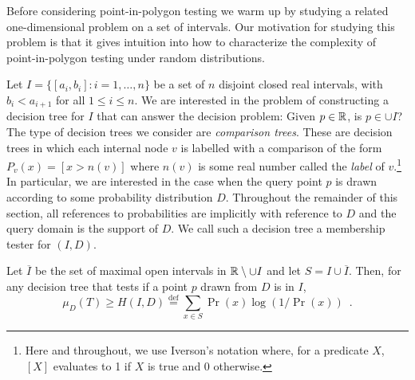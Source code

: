 \documentclass[charterfonts,lotsofwhite]{patmorin}
\newcommand{\defequals}{\stackrel{\mathrm{def}}{=}}
\begin{document}
Before considering point-in-polygon testing we warm up by studying a
related one-dimensional problem on a set of intervals.  Our motivation
for studying this problem is that it gives intuition into how to
characterize the complexity of point-in-polygon testing under random
distributions.

Let $I=\{[a_i,b_i]: i=1,\ldots,n\}$ be a set of $n$ disjoint closed
real intervals, with $b_i < a_{i+1}$ for all $1\le i\le n$.  We are
interested in the problem of constructing a decision tree for $I$ that
can answer the decision problem: Given $p\in\mathbb{R}$, is $p\in \cup I$?
The type of decision trees we consider are \emph{comparison trees}.
These are decision trees in which each internal node $v$ is labelled
with a comparison of the form $P_v(x) = [x > n(v)]$ where $n(v)$ is
some real number called the \emph{label} of $v$.\footnote{Here and
throughout, we use Iverson's notation \cite{kXX} where, for a
predicate $X$, $[X]$ evaluates to 1 if $X$ is true and 0 otherwise.}
In particular, we are interested in the case when the query point $p$
is drawn according to some probability distribution $D$.   Throughout
the remainder of this section, all references to probabilities are
implicitly with reference to $D$ and the query domain is the support
of $D$.  We call such a decision tree a membership tester for $(I,D)$.


\begin{lem}
Let $\overline{I}$ be the set of maximal open intervals in
$\mathbb{R}\setminus\cup I$ and let $S=I\cup \overline{I}$.  Then,
for any decision tree that tests if a point $p$ drawn from $D$
is in $I$,
\[
    \mu_D(T) \ge H(I,D) \defequals 
	\sum_{x\in S} \Pr(x)\log(1/\Pr(x)) \enspace .
\]
\end{lem}
\end{document}
